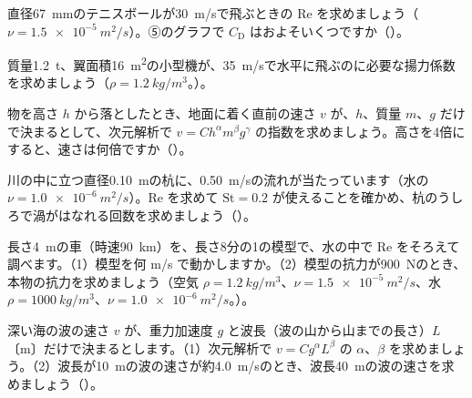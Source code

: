 \bkproblem 直径\qty{67}{mm}のテニスボールが\qty{30}{m/s}で飛ぶときの Re を求めましょう（$\nu=\allowbreak\qty{1.5e-5}{m^2/s}$）。⑤のグラフで $C_{\mathrm D}$ はおよそいくつですか\mbox{（）}。

\bkproblem 質量\qty{1.2}{t}、翼面積\qty{16}{m^2}の小型機が、\qty{35}{m/s}で水平に飛ぶのに必要な揚力係数を求めましょう（$\rho=\qty{1.2}{kg/m^3}$。\nobreak）。

\bkproblem 物を高さ $h$ から落としたとき、地面に着く直前の速さ $v$ が、$h$、質量 $m$、$g$ だけで決まるとして、次元解析で $v=Ch^{\alpha}m^{\beta}g^{\gamma}$ の指数を求めましょう。高さを4倍にすると、速さは何倍ですか（\nobreak{}\nobreak）。

\bkproblem 川の中に立つ直径\qty{0.10}{m}の杭に、\qty{0.50}{m/s}の流れが当たっています（水の $\nu=\qty{1.0e-6}{m^2/s}$）。Re を求めて $\mathrm{St}=0.2$ が使えることを確かめ、杭のうしろで渦がはなれる回数を求めましょう（）。


\bkproblem 長さ\qty{4}{m}の車（時速\qty{90}{km}）を、長さ8分の1の模型で、水の中で Re をそろえて調べます。（1）模型を何 m/s で動かしますか。（2）模型の抗力が\qty{900}{N}のとき、本物の抗力を求めましょう（空気 $\rho=\qty{1.2}{kg/m^3}$、$\nu=\qty{1.5e-5}{m^2/s}$、水 $\rho=\qty{1000}{kg/m^3}$、$\nu=\qty{1.0e-6}{m^2/s}$。\nobreak）。

\bkproblem 深い海の波の速さ $v$ が、重力加速度 $g$ と波長（波の山から山までの長さ）$L$〔m〕だけで決まるとします。（1）次元解析で $v=Cg^{\alpha}L^{\beta}$ の $\alpha$、$\beta$ を求めましょう。（2）波長が\qty{10}{m}の波の速さが約\qty{4.0}{m/s}のとき、波長\qty{40}{m}の波の速さを求めましょう（\nobreak{}\nobreak）。

